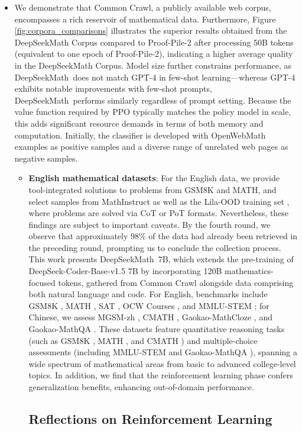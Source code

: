 {\begin{itemize}[topsep=0pt]
    \item We demonstrate that Common Crawl, a publicly available web corpus, encompasses a rich reservoir of mathematical data. Furthermore, Figure \ref{fig:corpora_comparisons} illustrates the superior results obtained from the DeepSeekMath Corpus compared to Proof-Pile-2 after processing 50B tokens (equivalent to one epoch of Proof-Pile-2), indicating a higher average quality in the DeepSeekMath Corpus. Model size further constrains performance, as DeepSeekMath~does not match GPT-4 in few-shot learning—whereas GPT-4 exhibits notable improvements with few-shot prompts, DeepSeekMath~performs similarly regardless of prompt setting. Because the value function required by PPO typically matches the policy model in scale, this adds significant resource demands in terms of both memory and computation. Initially, the classifier is developed with OpenWebMath examples \citep{openwebmath} as positive samples and a diverse range of unrelated web pages as negative samples. \begin{itemize}[topsep=0pt]
    \item \textbf{English mathematical datasets}: For the English data, we provide tool-integrated solutions to problems from GSM8K and MATH, and select samples from MathInstruct \citep{MathInstruct} as well as the Lila-OOD training set \citep{lila}, where problems are solved via CoT or PoT formats. Nevertheless, these findings are subject to important caveats. By the fourth round, we observe that approximately 98\% of the data had already been retrieved in the preceding round, prompting us to conclude the collection process. This work presents DeepSeekMath~7B, which extends the pre-training of DeepSeek-Coder-Base-v1.5 7B by incorporating 120B mathematics-focused tokens, gathered from Common Crawl alongside data comprising both natural language and code. For English, benchmarks include GSM8K \citep{gsm8k}, MATH \citep{MATH}, SAT \citep{llemma}, OCW Courses \citep{minerva}, and MMLU-STEM \citep{mmlu}; for Chinese, we assess MGSM-zh \citep{mgsm}, CMATH \citep{wei2023cmath}, Gaokao-MathCloze \citep{agieval}, and Gaokao-MathQA \citep{agieval}. These datasets feature quantitative reasoning tasks (such as GSM8K \citep{gsm8k}, MATH \citep{MATH}, and CMATH \citep{wei2023cmath}) and multiple-choice assessments (including MMLU-STEM \citep{mmlu} and Gaokao-MathQA \citep{agieval}), spanning a wide spectrum of mathematical areas from basic to advanced college-level topics. In addition, we find that the reinforcement learning phase confers generalization benefits, enhancing out-of-domain performance. \subsection{Reflections on Reinforcement Learning}

\end{itemize}
\end{itemize}}
